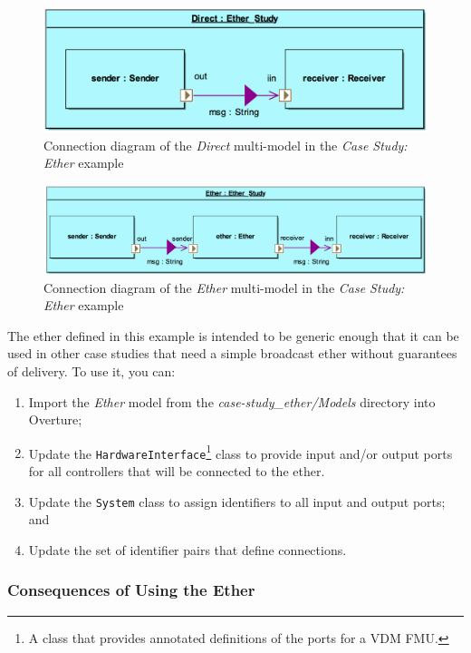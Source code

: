 \begin{figure}
\centering
\includegraphics[scale=0.2]{figures/ether_cd_direct}
\caption{Connection diagram of the \emph{Direct} multi-model in the \emph{Case Study: Ether} example}
\label{fig:snd_rec}
\end{figure}

\begin{figure}
\centering
\includegraphics[scale=0.25]{figures/ether_cd_ether}
\caption{Connection diagram of the \emph{Ether} multi-model in the \emph{Case Study: Ether} example}
\label{fig:snd_ether_rec}
\end{figure}

The ether defined in this example is intended to be generic enough that it can be used in other case studies that need a simple broadcast ether without guarantees of delivery. To use it, you can:

\begin{enumerate}[noitemsep]
\item Import the \emph{Ether} model from the \emph{case-study\_ether/Models} directory into Overture;
\item Update the \texttt{HardwareInterface}\footnote{A class that provides annotated definitions of the ports for a VDM FMU.} class to provide input and/or output ports for all controllers that will be connected to the ether.
\item Update the \texttt{System} class to assign identifiers to all input and output ports; and
\item Update the set of identifier pairs that define connections.
\end{enumerate}

\subsubsection{Consequences of Using the Ether}

